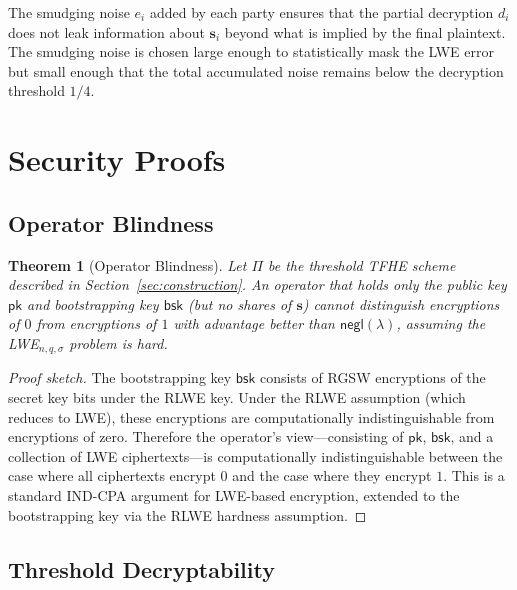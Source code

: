 \documentclass[11pt,a4paper]{article}
\newtheorem{theorem}{Theorem}[section]
\begin{document}
The smudging noise $e_i$ added by each party ensures that the partial
decryption $d_i$ does not leak information about $\mathbf{s}_i$ beyond
what is implied by the final plaintext.  The smudging noise is chosen
large enough to statistically mask the LWE error but small enough that
the total accumulated noise remains below the decryption threshold
$1/4$.

\section{Security Proofs}
\label{sec:security}

\subsection{Operator Blindness}

\begin{theorem}[Operator Blindness]
\label{thm:operator-blind}
Let $\Pi$ be the threshold TFHE scheme described in
Section~\ref{sec:construction}.  An operator that holds only the public
key $\mathsf{pk}$ and bootstrapping key $\mathsf{bsk}$ (but no shares
of $\mathbf{s}$) cannot distinguish encryptions of $0$ from encryptions
of $1$ with advantage better than $\mathsf{negl}(\lambda)$, assuming
the LWE$_{n,q,\sigma}$ problem is hard.
\end{theorem}

\begin{proof}[Proof sketch]
The bootstrapping key $\mathsf{bsk}$ consists of RGSW encryptions of
the secret key bits under the RLWE key.  Under the RLWE assumption
(which reduces to LWE), these encryptions are computationally
indistinguishable from encryptions of zero.  Therefore the operator's
view---consisting of $\mathsf{pk}$, $\mathsf{bsk}$, and a collection
of LWE ciphertexts---is computationally indistinguishable between the
case where all ciphertexts encrypt $0$ and the case where they encrypt
$1$.  This is a standard IND-CPA argument for LWE-based encryption,
extended to the bootstrapping key via the RLWE hardness assumption.
\end{proof}

\subsection{Threshold Decryptability}
\end{document}
